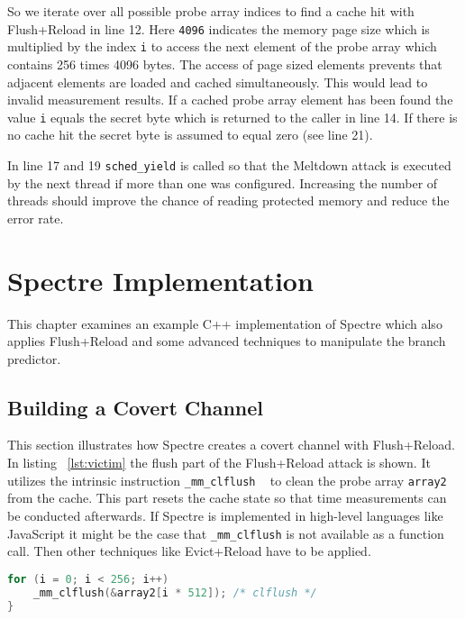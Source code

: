 \documentclass[a4paper,oneside,openright] {scrreprt}
\begin{document}
So we iterate over all possible probe array indices to find a cache hit with Flush+Reload in line 12.
Here \texttt{4096} indicates the memory page size which is multiplied by the index \texttt{i} to access the next element
of the probe array which contains 256 times 4096 bytes. The access of page sized elements prevents that adjacent elements are loaded
and cached simultaneously. This would lead to invalid measurement results.
If a cached probe array element has been found the value \texttt{i} equals the secret byte which is returned to the caller
in line 14. If there is no cache hit the secret byte is assumed to equal zero (see line 21).

In line 17 and 19 \texttt{sched\_yield} is called so that the Meltdown attack is executed by the next thread if more
than one was configured. 
Increasing the number of threads should improve the chance of reading protected memory and reduce the error rate.


\section{Spectre Implementation}
\label{ch:intro:motivation}

This chapter examines an example C++ implementation of Spectre which also applies Flush+Reload and some advanced techniques
to manipulate the branch predictor.

\subsection{Building a Covert Channel}
\label{ch:intro:motivation:A}
 
This section illustrates how Spectre creates a covert channel with Flush+Reload. 
In listing ~\ref{lst:victim} the flush part of the Flush+Reload attack is shown. It utilizes the intrinsic instruction 
\texttt{\_mm\_clflush} ~\cite{intelintrinsics} to clean the probe array \texttt{array2} from the cache. This part resets the cache state
so that time measurements can be conducted afterwards. If Spectre is implemented in high-level languages like JavaScript it
might be the case that \texttt{\_mm\_clflush} is not available as a function call. Then other techniques like Evict+Reload have
to be applied.

\begin{lstlisting}[language=C, caption=Spectre: Flush, label={lst:flush}]
for (i = 0; i < 256; i++)
    _mm_clflush(&array2[i * 512]); /* clflush */
}
\end{lstlisting}
\end{document}

